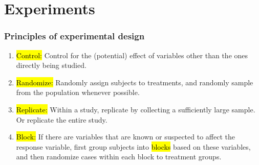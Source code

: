 \documentclass[slidestop,compress,mathserif]{beamer}
\begin{document}

\section{Experiments}


\begin{frame}
\frametitle{Principles of experimental design}

	\begin{enumerate}
		\item \hl{Control:} Control for the (potential) effect of variables other than the ones directly being studied.
		\item \hl{Randomize:} Randomly assign subjects to treatments, and randomly sample from the population whenever possible.
		\item \hl{Replicate:} Within a study, replicate by collecting a sufficiently large sample. Or replicate the entire study.
		\item \hl{Block:} If there are variables that are known or suspected to affect the response variable, first group subjects into \hl{blocks} based on these variables, and then randomize cases within each block to treatment groups.
	\end{enumerate}

\end{frame}

\end{document}
